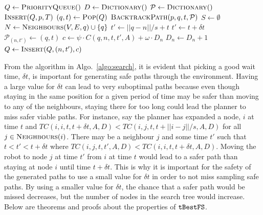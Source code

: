 \begin{algorithm}[ht]
    \caption{$\Function{SearchGraph}(V, E, R, A, p, g, T)$}
    \label{algo:search}
    \begin{algorithmic}[1]
        \setcounter{ALC@line}{0}
        \vspace*{1mm}
        \STATE $Q \leftarrow \Function{PriorityQueue}()$
        \STATE $D \leftarrow \Function{Dictionary}()$
        \STATE $\mathcal{P} \leftarrow \Function{Dictionary}()$
        \STATE $\Function{Insert}(Q, p, T)$
            \STATE $(q, t) \leftarrow \Function{Pop}(Q)$
                \RETURN $\Function{BacktrackPath}(p, q, t, \mathcal{P})$
            \ENDIF
            \STATE $S \leftarrow \emptyset$
            \STATE $N \leftarrow \Function{Neighbours}(V, E, q) \cup \{q\}$
                    \STATE $t' \leftarrow ||q - n|| / s + t$
                \ELSE
                    \STATE $t' \leftarrow t + \delta t$
                \ENDIF
                \STATE $\mathcal{P}_{(n, t')} \leftarrow (q, t)$
                \STATE $c \leftarrow \psi \cdot C(q, n, t, t', A) + \omega
                    \cdot D_{n}$
                \STATE $D_{n} \leftarrow D_{n} + 1$
                \STATE $Q \leftarrow \Function{Insert}(Q, (n, t'), c)$
            \ENDFOR
        \ENDWHILE
    \end{algorithmic}
\end{algorithm}

From the algorithm in Algo.~\ref{algo:search}, it is evident that picking a
good wait time, $\delta t$, is important for generating safe paths through the
environment. Having a large value for $\delta t$ can lead to very suboptimal
paths because even though staying in the same position for a given period of
time may be safer than moving to any of the neighbours, staying there for too
long could lead the planner to miss safer viable paths. For instance, say the
planner has expanded a node, $i$ at time $t$ and $TC(i, i, t, t + \delta t, A,
D) < TC(i, j, t, t + ||i - j|| / s, A, D)$ for all $j \in
\Function{Neighbours}(i)$. There may be a neighbour $j$ and some time $t'$ such
that $t < t' < t + \delta t$ where $TC(i, j, t, t', A, D) < TC(i, i, t, t +
\delta t, A, D)$. Moving the robot to node $j$ at time $t'$ from $i$ at time
$t$ would lead to a safer path than staying at node $i$ until time $t + \delta
t$. This is why it is important for the safety of the generated paths to use a
small value for $\delta t$ in order to not miss sampling safe paths. By using a
smaller value for $\delta t$, the chance that a safer path would be missed
decreases, but the number of nodes in the search tree would increase. Below are
theorems and proofs about the properties of $\Acronym{tBestFS}$.

